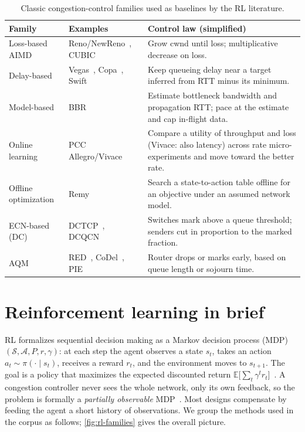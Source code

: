 \begin{table}[t]
\centering
\caption{Classic congestion-control families used as baselines by the RL literature.}
\label{tab:classic}
\small
\begin{tabularx}{\linewidth}{@{}L{2.5cm}L{3.3cm}Y@{}}
\toprule
Family & Examples & Control law (simplified) \\
\midrule
Loss-based AIMD & Reno/NewReno~\cite{rfc5681}, CUBIC~\cite{ha2008cubic} & Grow cwnd until loss; multiplicative decrease on loss. \\
Delay-based & Vegas~\cite{brakmo1995vegas}, Copa~\cite{arun2018copa}, Swift~\cite{kumar2020swift} & Keep queueing delay near a target inferred from RTT minus its minimum. \\
Model-based & BBR~\cite{cardwell2016bbr} & Estimate bottleneck bandwidth and propagation RTT; pace at the estimate and cap in-flight data. \\
Online learning & PCC Allegro/Vivace~\cite{dong2015pcc,dong2018vivace} & Compare a utility of throughput and loss (Vivace: also latency) across rate micro-experiments and move toward the better rate. \\
Offline optimization & Remy~\cite{winstein2013remy} & Search a state-to-action table offline for an objective under an assumed network model. \\
ECN-based (DC) & DCTCP~\cite{alizadeh2010dctcp}, DCQCN~\cite{zhu2015dcqcn} & Switches mark above a queue threshold; senders cut in proportion to the marked fraction. \\
AQM & RED~\cite{floyd1993red}, CoDel~\cite{nichols2012codel}, PIE~\cite{rfc8033} & Router drops or marks early, based on queue length or sojourn time. \\
\bottomrule
\end{tabularx}
\end{table}

\section{Reinforcement learning in brief}
\label{sec:rl-primer}

RL formalizes sequential decision making as a Markov decision process (MDP) $(\mathcal{S},\mathcal{A},P,r,\gamma)$: at each step the agent observes a state $s_t$, takes an action $a_t \sim \pi(\cdot\mid s_t)$, receives a reward $r_t$, and the environment moves to $s_{t+1}$. The goal is a policy that maximizes the expected discounted return $\mathbb{E}\big[\sum_t \gamma^t r_t\big]$~\cite{sutton2018reinforcement}. A congestion controller never sees the whole network, only its own feedback, so the problem is formally a \emph{partially observable} MDP~\cite{kaelbling1998planning}. Most designs compensate by feeding the agent a short history of observations. We group the methods used in the corpus as follows; \cref{fig:rl-families} gives the overall picture.

